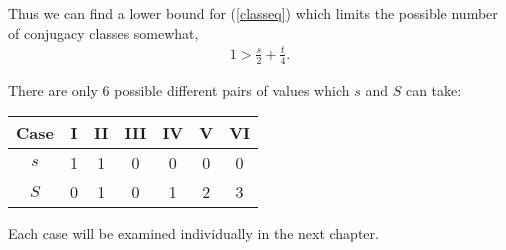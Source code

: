 Thus we can find a lower bound for (\ref{classeq}) which limits the possible number of conjugacy classes somewhat,
\begin{align*} 1 > \frac{s}{2} + \frac{t}{4}.
\end{align*}

There are only 6 possible different pairs of values which $s$ and $S$ can take: \vspace{3mm}

\begin{center}
\centering
  \begin{tabular}{||c||c|c|c|c|c|c||}
\hline
Case & I & II & III & IV & V & VI \\ [1ex]
\hline\hline
 $s$ & 1 & 1 & 0 & 0 & 0 & 0 \\ [1ex]
\hline
$S$ & 0 & 1 & 0 & 1 & 2 & 3 \\ [1ex]
 \hline
\end{tabular}
\end{center}
\vspace{2mm}

Each case will be examined individually in the next chapter.